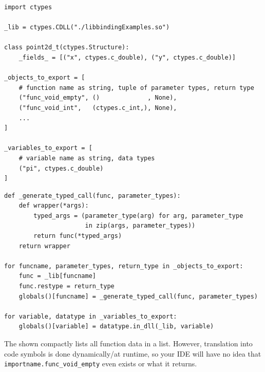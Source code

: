 
\begin{frame}[fragile]
%
\begin{codebox}
\begin{verbatim}
import ctypes

_lib = ctypes.CDLL("./libbindingExamples.so")

class point2d_t(ctypes.Structure):
    _fields_ = [("x", ctypes.c_double), ("y", ctypes.c_double)]

_objects_to_export = [
    # function name as string, tuple of parameter types, return type
    ("func_void_empty", ()             , None),
    ("func_void_int",   (ctypes.c_int,), None),
    ...
]

_variables_to_export = [
    # variable name as string, data types
    ("pi", ctypes.c_double)
]
\end{verbatim}
\end{codebox}
%
\end{frame}


\begin{frame}[fragile]
%
\begin{codebox}[... Continued]
\begin{verbatim}
def _generate_typed_call(func, parameter_types):
    def wrapper(*args):
        typed_args = (parameter_type(arg) for arg, parameter_type 
                      in zip(args, parameter_types))
        return func(*typed_args)
    return wrapper
    
for funcname, parameter_types, return_type in _objects_to_export:
    func = _lib[funcname]
    func.restype = return_type
    globals()[funcname] = _generate_typed_call(func, parameter_types)

for variable, datatype in _variables_to_export:
    globals()[variable] = datatype.in_dll(_lib, variable)
\end{verbatim}
\end{codebox}
%
\begin{warnbox}
\footnotesize
The shown compactly lists all function data in a list. However, translation into code symbols is done dynamically/at runtime, so your IDE will have no idea that \texttt{importname.func\_void\_empty} even exists or what it returns.
\end{warnbox}
%
\end{frame}

